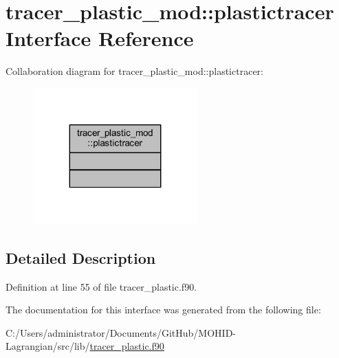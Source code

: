 \hypertarget{interfacetracer__plastic__mod_1_1plastictracer}{}\section{tracer\+\_\+plastic\+\_\+mod\+:\+:plastictracer Interface Reference}
\label{interfacetracer__plastic__mod_1_1plastictracer}


Collaboration diagram for tracer\+\_\+plastic\+\_\+mod\+:\+:plastictracer\+:\nopagebreak
\begin{figure}[H]
\begin{center}
\leavevmode
\includegraphics[width=179pt]{interfacetracer__plastic__mod_1_1plastictracer__coll__graph}
\end{center}
\end{figure}


\subsection{Detailed Description}


Definition at line 55 of file tracer\+\_\+plastic.\+f90.



The documentation for this interface was generated from the following file\+:\begin{DoxyCompactItemize}
\item 
C\+:/\+Users/administrator/\+Documents/\+Git\+Hub/\+M\+O\+H\+I\+D-\/\+Lagrangian/src/lib/\mbox{\hyperlink{tracer__plastic_8f90}{tracer\+\_\+plastic.\+f90}}\end{DoxyCompactItemize}
